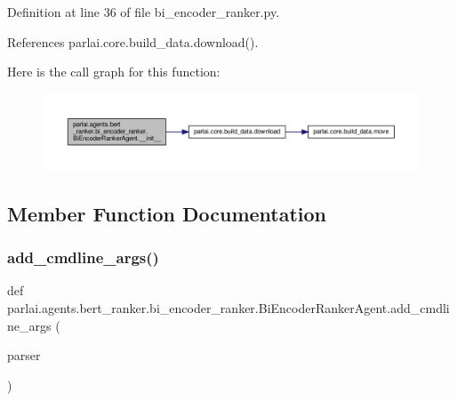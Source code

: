 Definition at line 36 of file bi\+\_\+encoder\+\_\+ranker.\+py.



References parlai.\+core.\+build\+\_\+data.\+download().

Here is the call graph for this function\+:
\nopagebreak
\begin{figure}[H]
\begin{center}
\leavevmode
\includegraphics[width=350pt]{classparlai_1_1agents_1_1bert__ranker_1_1bi__encoder__ranker_1_1BiEncoderRankerAgent_a353144d4f4c3182774913c4ddba33de9_cgraph}
\end{center}
\end{figure}


\subsection{Member Function Documentation}
\mbox{\label{classparlai_1_1agents_1_1bert__ranker_1_1bi__encoder__ranker_1_1BiEncoderRankerAgent_a94b0668eadb20cdd95bd5f95641fc2a6}} 
\subsubsection{\texorpdfstring{add\+\_\+cmdline\+\_\+args()}{add\_cmdline\_args()}}
{\footnotesize\ttfamily def parlai.\+agents.\+bert\+\_\+ranker.\+bi\+\_\+encoder\+\_\+ranker.\+Bi\+Encoder\+Ranker\+Agent.\+add\+\_\+cmdline\+\_\+args (\begin{DoxyParamCaption}\item[{}]{parser }\end{DoxyParamCaption})\hspace{0.3cm}{\ttfamily [static]}}



